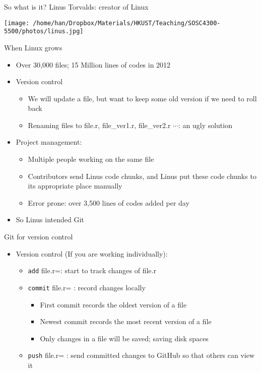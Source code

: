 \documentclass[handout]{beamer}
\begin{document}
\begin{frame}[label={h:a5507e6f-d29b-40ab-ac97-b4852a58ed30}]{So what is it?}
Linus Torvalds: creator of Linux

\begin{center}
\texttt{[image: /home/han/Dropbox/Materials/HKUST/Teaching/SOSC4300-5500/photos/linus.jpg]}
\end{center}
\end{frame}

\begin{frame}[label={h:f78d75ba-a202-431e-8638-663e6294d5c0}]{When Linux grows}
\begin{itemize}
\item Over 30,000 files; 15 Million lines of codes in 2012
\item Version control
\begin{itemize}
\item We will update a file, but want to keep some old version if we need to roll back
\item Renaming files to file.r, file\_ver1.r, file\_ver2.r \(\cdots\): an ugly solution
\end{itemize}
\item Project management: 
\begin{itemize}
\item Multiple people working on the same file
\item Contributors send Linus code chunks, and Linus put these code chunks to its appropriate place manually
\item Error prone: over 3,500 lines of codes added per day
\end{itemize}
\item So Linus intended \alert{Git}
\end{itemize}
\end{frame}

\begin{frame}[fragile,label={h:0fc75871-6104-4b9f-a078-b856b0354b8c}]{Git for version control}
 \begin{itemize}
\item Version control (If you are working individually):
\begin{itemize}
\item \texttt{add} file.r=: start to track changes of file.r
\item \texttt{commit} file.r= : record changes locally
\begin{itemize}
\item First commit records the oldest version of a file
\item Newest commit records the most recent version of a file
\item Only changes in a file will be saved; saving disk spaces
\end{itemize}
\item \texttt{push} file.r= : send committed changes to GitHub so that others can view it
\end{itemize}
\end{itemize}
\end{frame}
\end{document}
